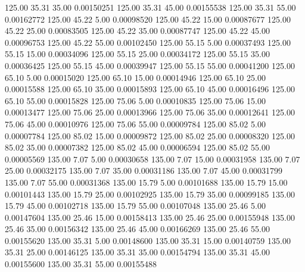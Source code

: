     125.00     35.31     35.00     0.00150251
    125.00     35.31     45.00     0.00155538
    125.00     35.31     55.00     0.00162772
    125.00     45.22      5.00     0.00098520
    125.00     45.22     15.00     0.00087677
    125.00     45.22     25.00     0.00083505
    125.00     45.22     35.00     0.00087747
    125.00     45.22     45.00     0.00096753
    125.00     45.22     55.00     0.00102450
    125.00     55.15      5.00     0.00037493
    125.00     55.15     15.00     0.00034096
    125.00     55.15     25.00     0.00034172
    125.00     55.15     35.00     0.00036425
    125.00     55.15     45.00     0.00039947
    125.00     55.15     55.00     0.00041200
    125.00     65.10      5.00     0.00015020
    125.00     65.10     15.00     0.00014946
    125.00     65.10     25.00     0.00015588
    125.00     65.10     35.00     0.00015893
    125.00     65.10     45.00     0.00016496
    125.00     65.10     55.00     0.00015828
    125.00     75.06      5.00     0.00010835
    125.00     75.06     15.00     0.00013477
    125.00     75.06     25.00     0.00013966
    125.00     75.06     35.00     0.00012641
    125.00     75.06     45.00     0.00010976
    125.00     75.06     55.00     0.00009784
    125.00     85.02      5.00     0.00007784
    125.00     85.02     15.00     0.00009872
    125.00     85.02     25.00     0.00008320
    125.00     85.02     35.00     0.00007382
    125.00     85.02     45.00     0.00006594
    125.00     85.02     55.00     0.00005569
    135.00      7.07      5.00     0.00030658
    135.00      7.07     15.00     0.00031958
    135.00      7.07     25.00     0.00032175
    135.00      7.07     35.00     0.00031186
    135.00      7.07     45.00     0.00031799
    135.00      7.07     55.00     0.00031368
    135.00     15.79      5.00     0.00101688
    135.00     15.79     15.00     0.00101443
    135.00     15.79     25.00     0.00102925
    135.00     15.79     35.00     0.00099185
    135.00     15.79     45.00     0.00102718
    135.00     15.79     55.00     0.00107048
    135.00     25.46      5.00     0.00147604
    135.00     25.46     15.00     0.00158413
    135.00     25.46     25.00     0.00155948
    135.00     25.46     35.00     0.00156342
    135.00     25.46     45.00     0.00166269
    135.00     25.46     55.00     0.00155620
    135.00     35.31      5.00     0.00148600
    135.00     35.31     15.00     0.00140759
    135.00     35.31     25.00     0.00146125
    135.00     35.31     35.00     0.00154794
    135.00     35.31     45.00     0.00155600
    135.00     35.31     55.00     0.00155488
